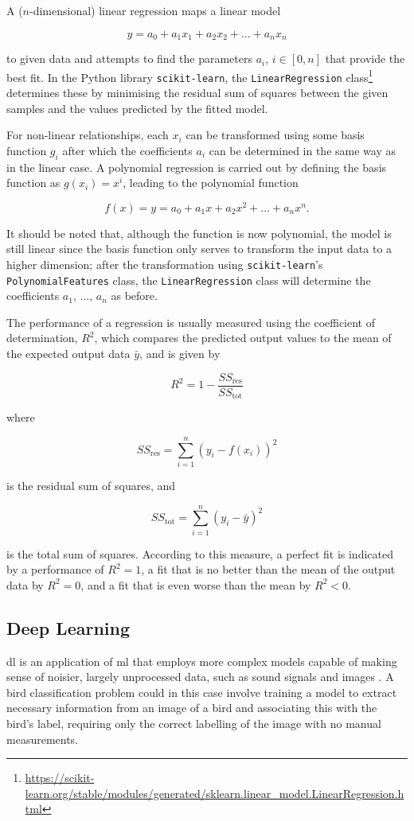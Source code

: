 A (\(n\)-dimensional) linear regression maps a linear model

\[
    y = a_0 + a_1 x_1 + a_2 x_2 + \ldots + a_n x_n
\]

to given data and attempts to find the parameters \(a_i\), \(i \in \left[0, n\right]\) that provide the best fit. In the Python library \texttt{scikit-learn}, the \texttt{LinearRegression} class\footnote{\url{https://scikit-learn.org/stable/modules/generated/sklearn.linear_model.LinearRegression.html}} determines these by minimising the residual sum of squares between the given samples and the values predicted by the fitted model.

For non-linear relationships, each \(x_i\) can be transformed using some basis function \(g_i\) after which the coefficients \(a_i\) can be determined in the same way as in the linear case. A polynomial regression is carried out by defining the basis function as \(g(x_i) = x^i\), leading to the polynomial function

\[
    f(x) = y = a_0 + a_1 x + a_2 x^2 + \ldots + a_n x^n.
\]

It should be noted that, although the function is now polynomial, the model is still linear since the basis function only serves to transform the input data to a higher dimension; after the transformation using \texttt{scikit-learn}'s \texttt{PolynomialFeatures} class, the \texttt{LinearRegression} class will determine the coefficients \(a_1,\,\ldots,\,a_n\) as before.

The performance of a regression is usually measured using the coefficient of determination, \(R^2\), which compares the predicted output values to the mean of the expected output data \(\bar{y}\), and is given by

\[
    R^2 = 1 - \frac{SS_{\text{res}}}{SS_{\text{tot}}}
\]

where

\[
    SS_{\text{res}} = \sum_{i=1}^{n}{\left(y_i - f(x_i)\right)}^2
\]

is the residual sum of squares, and

\[
    SS_{\text{tot}} = \sum_{i=1}^{n}{\left(y_i - \bar{y}\right)}^2
\]

is the total sum of squares. According to this measure, a perfect fit is indicated by a performance of \(R^2 = 1\), a fit that is no better than the mean of the output data by \(R^2 = 0\), and a fit that is even worse than the mean by \(R^2 < 0\).

\subsection{Deep Learning}
\ac{dl} is an application of \ac{ml} that employs more complex models capable of making sense of noisier, largely unprocessed data, such as sound signals and images \cite[]{goodfellow_deep_2016}. A bird classification problem could in this case involve training a model to extract necessary information from an image of a bird and associating this with the bird's label, requiring only the correct labelling of the image with no manual measurements.

